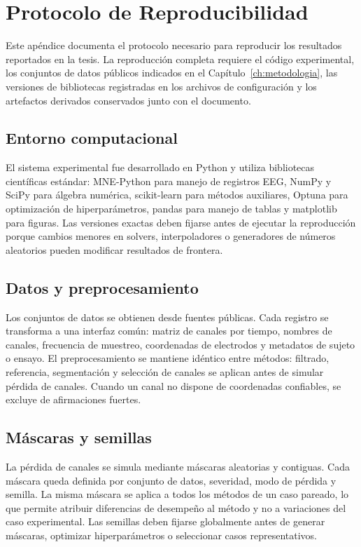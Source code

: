 \chapter{Protocolo de Reproducibilidad}
\label{ap:reproducibilidad}

Este apéndice documenta el protocolo necesario para reproducir los resultados reportados en la tesis. La reproducción completa requiere el código experimental, los conjuntos de datos públicos indicados en el Capítulo~\ref{ch:metodologia}, las versiones de bibliotecas registradas en los archivos de configuración y los artefactos derivados conservados junto con el documento.

\section{Entorno computacional}

El sistema experimental fue desarrollado en Python y utiliza bibliotecas científicas estándar: MNE-Python para manejo de registros EEG, NumPy y SciPy para álgebra numérica, scikit-learn para métodos auxiliares, Optuna para optimización de hiperparámetros, pandas para manejo de tablas y matplotlib para figuras. Las versiones exactas deben fijarse antes de ejecutar la reproducción porque cambios menores en solvers, interpoladores o generadores de números aleatorios pueden modificar resultados de frontera.

\section{Datos y preprocesamiento}

Los conjuntos de datos se obtienen desde fuentes públicas. Cada registro se transforma a una interfaz común: matriz de canales por tiempo, nombres de canales, frecuencia de muestreo, coordenadas de electrodos y metadatos de sujeto o ensayo. El preprocesamiento se mantiene idéntico entre métodos: filtrado, referencia, segmentación y selección de canales se aplican antes de simular pérdida de canales. Cuando un canal no dispone de coordenadas confiables, se excluye de afirmaciones fuertes.

\section{Máscaras y semillas}

La pérdida de canales se simula mediante máscaras aleatorias y contiguas. Cada máscara queda definida por conjunto de datos, severidad, modo de pérdida y semilla. La misma máscara se aplica a todos los métodos de un caso pareado, lo que permite atribuir diferencias de desempeño al método y no a variaciones del caso experimental. Las semillas deben fijarse globalmente antes de generar máscaras, optimizar hiperparámetros o seleccionar casos representativos.

